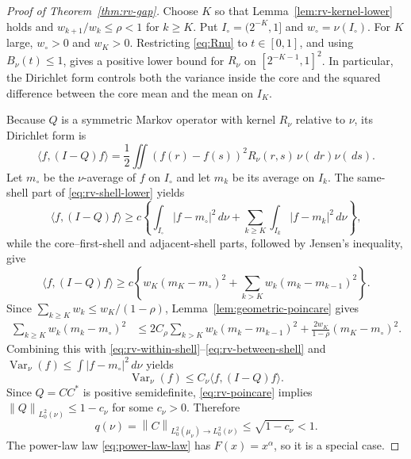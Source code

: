 \documentclass[11pt]{article}
\theoremstyle{definition}
\theoremstyle{remark}
\newcommand{\Var}{\operatorname{Var}}
\newcommand{\dd}{\,d}
\newcommand{\norm}[1]{\left\lVert#1\right\rVert}
\begin{document}
\begin{proof}[Proof of Theorem~\ref{thm:rv-gap}]
Choose $K$ so that Lemma~\ref{lem:rv-kernel-lower} holds and
$w_{k+1}/w_k\le\rho<1$ for $k\ge K$.  Put
$I_\circ=(2^{-K},1]$ and $w_\circ=\nu(I_\circ)$.  For $K$ large,
$w_\circ>0$ and $w_K>0$.  Restricting \eqref{eq:Rnu} to $t\in[0,1]$, and
using $B_\nu(t)\le1$, gives a positive lower bound for $R_\nu$ on
$[2^{-K-1},1]^2$.  In particular, the Dirichlet form controls both the variance
inside the core and the squared difference between the core mean and the mean
on $I_K$.

Because $Q$ is a symmetric Markov operator with kernel $R_\nu$ relative to
$\nu$, its Dirichlet form is
\begin{equation}
 \langle f,(I-Q)f\rangle
 =\frac12\iint (f(r)-f(s))^2R_\nu(r,s)\,\nu(\dd r)\nu(\dd s).
 \label{eq:rv-dirichlet-form}
\end{equation}
Let $m_\circ$ be the $\nu$-average of $f$ on $I_\circ$ and let $m_k$ be its
average on $I_k$.  The same-shell part of
\eqref{eq:rv-shell-lower} yields
\begin{equation}
 \langle f,(I-Q)f\rangle
 \ge c\left\{\int_{I_\circ}|f-m_\circ|^2\dd\nu
       +\sum_{k\ge K}\int_{I_k}|f-m_k|^2\dd\nu\right\},
 \label{eq:rv-within-shell}
\end{equation}
while the core--first-shell and adjacent-shell parts, followed by Jensen's
inequality, give
\begin{equation}
 \langle f,(I-Q)f\rangle
 \ge c\left\{w_K(m_K-m_\circ)^2
       +\sum_{k>K}w_k(m_k-m_{k-1})^2\right\}.
 \label{eq:rv-between-shell}
\end{equation}
Since $\sum_{k\ge K}w_k\le w_K/(1-\rho)$,
Lemma~\ref{lem:geometric-poincare} gives
\begin{align}
 \sum_{k\ge K}w_k(m_k-m_\circ)^2
 &\le 2C_\rho\sum_{k>K}w_k(m_k-m_{k-1})^2
       +\frac{2w_K}{1-\rho}(m_K-m_\circ)^2.
 \label{eq:core-shell-poincare}
\end{align}
Combining this with \eqref{eq:rv-within-shell}--\eqref{eq:rv-between-shell}
and $\Var_\nu(f)\le\int|f-m_\circ|^2\dd\nu$ yields
\begin{equation}
  \Var_\nu(f)
  \le C_\nu\langle f,(I-Q)f\rangle.
  \label{eq:rv-poincare}
\end{equation}
Since $Q=CC^*$ is positive semidefinite, \eqref{eq:rv-poincare} implies
$\norm{Q}_{L^2_0(\nu)}\le1-c_\nu$ for some $c_\nu>0$.  Therefore
\[
  q(\nu)=\norm{C}_{L^2_0(\mu_\nu)\to L^2_0(\nu)}
  \le\sqrt{1-c_\nu}<1.
\]
The power-law law \eqref{eq:power-law-law} has $F(x)=x^\alpha$, so it is a
special case.
\end{proof}
\end{document}
